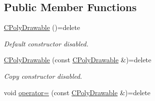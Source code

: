 \subsection*{Public Member Functions}
\begin{DoxyCompactItemize}
\item 
\hyperlink{class_c_poly_drawable_ae4265afa898200aa70a943cdea3f8123}{C\+Poly\+Drawable} ()=delete
\begin{DoxyCompactList}\small\item\em Default constructor disabled. \end{DoxyCompactList}\item 
\hypertarget{class_c_poly_drawable_abfdd10484ab2cb6ea99c01849cad4082}{\hyperlink{class_c_poly_drawable_abfdd10484ab2cb6ea99c01849cad4082}{C\+Poly\+Drawable} (const \hyperlink{class_c_poly_drawable}{C\+Poly\+Drawable} \&)=delete}\label{class_c_poly_drawable_abfdd10484ab2cb6ea99c01849cad4082}

\begin{DoxyCompactList}\small\item\em Copy constructor disabled. \end{DoxyCompactList}\item 
\hypertarget{class_c_poly_drawable_a86a6c65081b7feb556e5563b36a6ac8a}{void \hyperlink{class_c_poly_drawable_a86a6c65081b7feb556e5563b36a6ac8a}{operator=} (const \hyperlink{class_c_poly_drawable}{C\+Poly\+Drawable} \&)=delete}\label{class_c_poly_drawable_a86a6c65081b7feb556e5563b36a6ac8a}


\end{DoxyCompactItemize}
